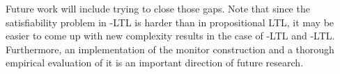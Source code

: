 Future work will include trying to close those gaps.  Note that since the
satisfiability problem in \ALC-LTL is harder than in propositional LTL, it may
be easier to come up with new complexity results in the case of \ALC-LTL and
\SHOQ-LTL\@.
%
Furthermore, an implementation of the monitor construction and a thorough
empirical evaluation of it is an important direction of future research.
